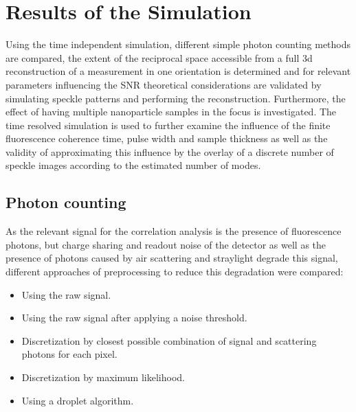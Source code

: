 \section{Results of the Simulation}
Using the time independent simulation, different simple photon counting methods are compared, the extent of the reciprocal space accessible from a full 3d reconstruction of a measurement in one orientation is determined and for relevant parameters influencing the SNR theoretical considerations are validated by simulating speckle patterns and performing the reconstruction. Furthermore, the effect of having multiple nanoparticle samples in the focus is investigated. The time resolved simulation is used to further examine the influence of the finite fluorescence coherence time, pulse width and sample thickness as well as the validity of approximating this influence by the overlay of a discrete number of speckle images according to the estimated number of modes.

\subsection{Photon counting}
As the relevant signal for the correlation analysis is the presence of fluorescence photons, but charge sharing and readout noise of the detector as well as the presence of photons caused by air scattering and straylight degrade this signal, different approaches of preprocessing to reduce this degradation were compared:
\begin{samepage}
\begin{itemize}[nosep]
	\item Using the raw signal.
	\item Using the raw signal after applying a noise threshold.
	\item Discretization by closest possible combination of signal and scattering photons for each pixel.
	\item Discretization by maximum likelihood.
	\item Using a droplet algorithm.
\end{itemize}
\end{samepage}

